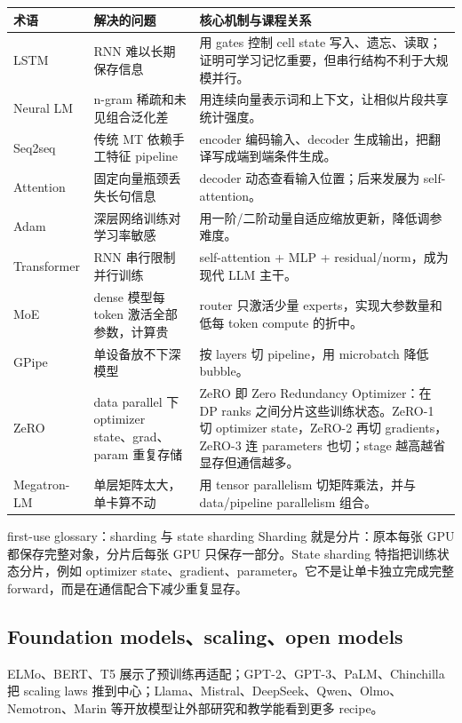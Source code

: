 \begin{longtable}{p{}p{}p{}}
\toprule
\textbf{术语} & \textbf{解决的问题} & \textbf{核心机制与课程关系} \\
\midrule
LSTM & RNN 难以长期保存信息 & 用 gates 控制 cell state 写入、遗忘、读取；证明可学习记忆重要，但串行结构不利于大规模并行。 \\
Neural LM & n-gram 稀疏和未见组合泛化差 & 用连续向量表示词和上下文，让相似片段共享统计强度。 \\
Seq2seq & 传统 MT 依赖手工特征 pipeline & encoder 编码输入、decoder 生成输出，把翻译写成端到端条件生成。 \\
Attention & 固定向量瓶颈丢失长句信息 & decoder 动态查看输入位置；后来发展为 self-attention。 \\
Adam & 深层网络训练对学习率敏感 & 用一阶/二阶动量自适应缩放更新，降低调参难度。 \\
Transformer & RNN 串行限制并行训练 & self-attention + MLP + residual/norm，成为现代 LLM 主干。 \\
MoE & dense 模型每 token 激活全部参数，计算贵 & router 只激活少量 experts，实现大参数量和低每 token compute 的折中。 \\
GPipe & 单设备放不下深模型 & 按 layers 切 pipeline，用 microbatch 降低 bubble。 \\
ZeRO & data parallel 下 optimizer state、grad、param 重复存储 & ZeRO 即 Zero Redundancy Optimizer：在 DP ranks 之间分片这些训练状态。ZeRO-1 切 optimizer state，ZeRO-2 再切 gradients，ZeRO-3 连 parameters 也切；stage 越高越省显存但通信越多。 \\
Megatron-LM & 单层矩阵太大，单卡算不动 & 用 tensor parallelism 切矩阵乘法，并与 data/pipeline parallelism 组合。 \\
\bottomrule
\end{longtable}

\begin{knowledgebox}{first-use glossary：sharding 与 state sharding}
Sharding 就是分片：原本每张 GPU 都保存完整对象，分片后每张 GPU 只保存一部分。State sharding 特指把训练状态分片，例如 optimizer state、gradient、parameter。它不是让单卡独立完成完整 forward，而是在通信配合下减少重复显存。
\end{knowledgebox}

\subsection{Foundation models、scaling、open models}

ELMo、BERT、T5 展示了预训练再适配；GPT-2、GPT-3、PaLM、Chinchilla 把 scaling laws 推到中心；Llama、Mistral、DeepSeek、Qwen、Olmo、Nemotron、Marin 等开放模型让外部研究和教学能看到更多 recipe。

